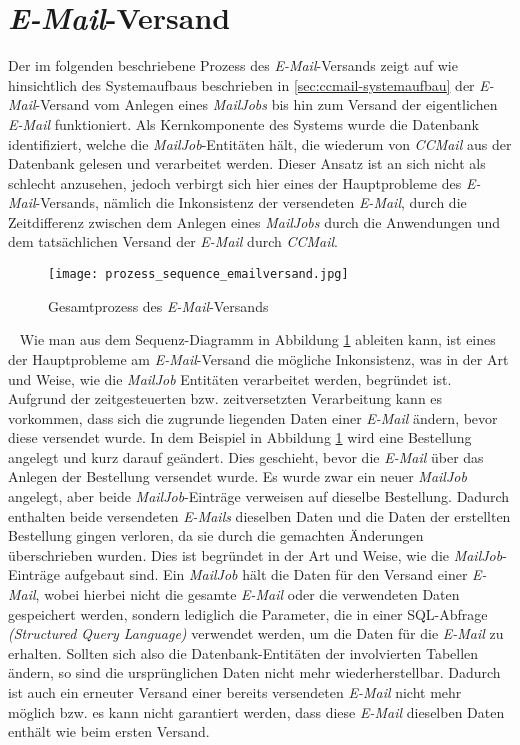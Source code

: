 \section{\emph{E-Mail}-Versand}
\label{sec:ccmail-email-versand}
Der im folgenden beschriebene Prozess des \emph{E-Mail}-Versands zeigt auf wie hinsichtlich des Systemaufbaus beschrieben in \ref{sec:ccmail-systemaufbau} der \emph{E-Mail}-Versand vom Anlegen eines \emph{MailJobs} bis hin zum Versand der eigentlichen \emph{E-Mail} funktioniert. 
\newline
\newline
Als Kernkomponente des Systems wurde die Datenbank identifiziert, welche die \emph{MailJob}-Entitäten hält, die wiederum von \emph{CCMail} aus der Datenbank gelesen und verarbeitet werden. Dieser Ansatz ist an sich nicht als schlecht anzusehen, jedoch verbirgt sich hier eines der Hauptprobleme des \emph{E-Mail}-Versands, nämlich die Inkonsistenz der versendeten \emph{E-Mail}, durch die Zeitdifferenz zwischen dem Anlegen eines \emph{MailJobs} durch die Anwendungen und dem tatsächlichen Versand der \emph{E-Mail} durch \emph{CCMail}.
\begin{figure}[h]
\centering
\texttt{[image: prozess\_sequence\_emailversand.jpg]}
\caption{Gesamtprozess des \emph{E-Mail}-Versands}
\label{fig:sequence-diagramm-gesamtprozess}
\end{figure}
\ \newline
Wie man aus dem Sequenz-Diagramm in Abbildung \ref{fig:sequence-diagramm-gesamtprozess} ableiten kann, ist eines der Hauptprobleme am \emph{E-Mail}-Versand die mögliche Inkonsistenz, was in der Art und Weise, wie die \emph{MailJob} Entitäten verarbeitet werden, begründet ist. Aufgrund der zeitgesteuerten bzw. zeitversetzten Verarbeitung kann es vorkommen, dass sich die zugrunde liegenden Daten einer \emph{E-Mail} ändern, bevor diese versendet wurde. In dem Beispiel in Abbildung \ref{fig:sequence-diagramm-gesamtprozess} wird eine Bestellung angelegt und kurz darauf geändert. Dies geschieht, bevor die \emph{E-Mail} über das Anlegen der Bestellung versendet wurde. Es wurde zwar ein neuer \emph{MailJob} angelegt, aber beide \emph{MailJob}-Einträge verweisen auf dieselbe Bestellung. Dadurch enthalten beide versendeten \emph{E-Mails} dieselben Daten und die Daten der erstellten Bestellung gingen verloren, da sie durch die gemachten Änderungen überschrieben wurden. 
\newpage
Dies ist begründet in der Art und Weise, wie die \emph{MailJob}-Einträge aufgebaut sind. Ein \emph{MailJob} hält die Daten für den Versand einer \emph{E-Mail}, wobei hierbei nicht die gesamte \emph{E-Mail} oder die verwendeten Daten gespeichert werden, sondern lediglich die Parameter, die in einer SQL-Abfrage \emph{(Structured Query Language)} verwendet werden, um die Daten für die \emph{E-Mail} zu erhalten. Sollten sich also die Datenbank-Entitäten der involvierten Tabellen ändern, so sind die ursprünglichen Daten nicht mehr wiederherstellbar. Dadurch ist auch ein erneuter Versand einer bereits versendeten \emph{E-Mail} nicht mehr möglich bzw. es kann nicht garantiert werden, dass diese \emph{E-Mail} dieselben Daten enthält wie beim ersten Versand.
